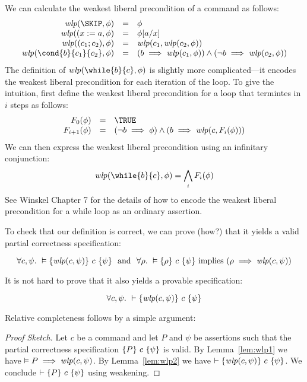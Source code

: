 We can calculate the weakest liberal precondition of a command as
follows:
%
\[
\begin{array}{rcl} 
\wpre{\SKIP}{\phi} & = & \phi\\
\wpre{(x := a}{\phi} &=& \phi[a/x]\\
\wpre{(c_1;c_2)}{\phi} &=& \wpre{c_1}{\wpre{c_2}{\phi}}\\
\wpre{\cond{b}{c_1}{c_2}}{\phi} &=& (b \implies \wpre{c_1}{\phi}) \wedge (\neg b \implies \wpre{c_2}{\phi})\\
\end{array}
\]
%
The definition of $\wpre{\while{b}{c}}{\phi}$ is slightly more
complicated---it encodes the weakest liberal precondition for each
iteration of the loop. To give the intuition, first define the weakest
liberal precondition for a loop that termintes in $i$ steps as
follows:
%
\[
\begin{array}{rcl}
F_0(\phi) & = & \TRUE\\
F_{i+1}(\phi) & = & (\neg b \implies \phi) \wedge (b \implies \wpre{c}{F_i(\phi)})
\end{array}
\]
%
We can then express the weakest liberal precondition using an
infinitary conjunction:
%
\[
\wpre{\while{b}{c}}{\phi} = \bigwedge_i F_i(\phi)
\]
%
See Winskel Chapter 7 for the details of how to encode the weakest
liberal precondition for a while loop as an ordinary assertion.
 
To check that our definition is correct, we can prove (how?) that it
yields a valid partial correctness specification:
%
\begin{lemma}\label{lem:wlp1}
\[
\forall c, \psi.~ \vDash \{ \mathit{wlp}(c,\psi) \}{~}c{~}\{ \psi \}~~\text{and}~~
\forall \rho.~\vDash \{ \rho \}{~}c{~}\{ \psi \} \text{ implies } (\rho \implies \mathit{wlp}(c,\psi))
\]
\end{lemma}
%
It is not hard to prove that it also yields a provable specification:
%
\begin{lemma}\label{lem:wlp2}
\[
\forall c, \psi.~ \vdash \{ \mathit{wlp}(c,\psi) \}{~}c{~}\{ \psi \}
\]
\end{lemma}
%
\noindent Relative completeness follows by a simple argument:
%
\begin{proof}[Proof Sketch] Let $c$ be a command and let $P$ and $\psi$
  be assertions such that the partial correctness specification
  $\{ P \}{~}c{~}\{ \psi \}$ is valid. By Lemma~\ref{lem:wlp1} we have $\vDash
  P \implies \mathit{wlp}(c,\psi)$. By Lemma~\ref{lem:wlp2} we have
  $\vdash\{ \mathit{wlp}(c,\psi) \}{~}c{~}\{ \psi \}$. We conclude $\vdash
  \{ P \}{~}c{~}\{ \psi \}$ using weakening.
\end{proof}
